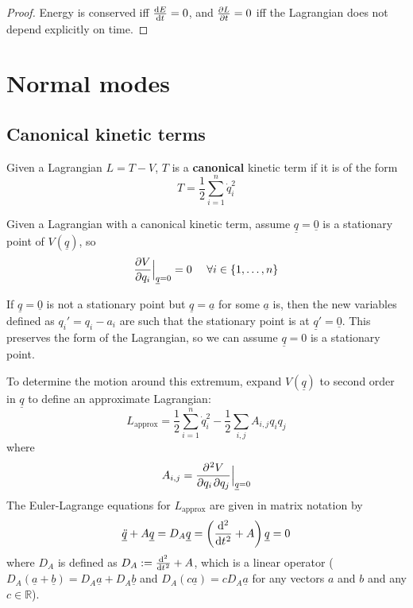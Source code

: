 \begin{proof}
	Energy is conserved iff $\diff{E}{t} = 0$, and $\diffp{L}{t} = 0$ iff the Lagrangian does not depend explicitly on time.
\end{proof}

\section{Normal modes}

\subsection{Canonical kinetic terms}

\begin{definition}
	Given a Lagrangian $L = T - V$, $T$ is a \textbf{canonical} kinetic term if it is of the form
	\[
		T = \frac{1}{2} \sum_{i = 1}^{n} \dot{q}_i^2
	\]
\end{definition}

Given a Lagrangian with a canonical kinetic term, assume $\underline{q} = \underline{0}$ is a stationary point of $V(\underline{q})$, so
\[
	\diffp{V}{q_i} \Big|_{\underline{q} = 0} = 0 \quad \forall i \in \{ 1, \dots, n \}
\]

If $\underline{q} = \underline{0}$ is not a stationary point but $\underline{q} = \underline{a}$ for some $\underline{a}$ is, then the new variables defined as $q_i' = q_i - a_i$ are such that the stationary point is at $\underline{q}' = \underline{0}$. This preserves the form of the Lagrangian, so we can assume $\underline{q} = 0$ is a stationary point.

To determine the motion around this extremum, expand $V(\underline{q})$ to second order in $\underline{q}$ to define an approximate Lagrangian:
\[
	L_{\text{approx}} = \frac{1}{2} \sum_{i = 1}^{n} \dot{q}_i^2 - \frac{1}{2} \sum_{i, j} A_{i, j} q_i q_j
\]
where
\[
	A_{i, j} = \diffp[1, 1]V{q_i, q_j} \Big|_{\underline{q} = 0}
\]
The Euler-Lagrange equations for $L_{\text{approx}}$ are given in matrix notation by
\[
	\underline{\ddot{q}} + A \underline{q} = D_A \underline{q} = \left( \diff[2]{}{t} + A \right) \underline{q} = 0
\]
where $D_A$ is defined as $D_A := \diff[2]{}{t} + A$, which is a linear operator ($D_A (\underline{a} + \underline{b}) = D_A \underline{a} + D_A \underline{b}$ and $D_A (c \underline{a}) = c D_A \underline{a}$ for any vectors $a$ and $b$ and any $c \in \mathbb{R}$).

